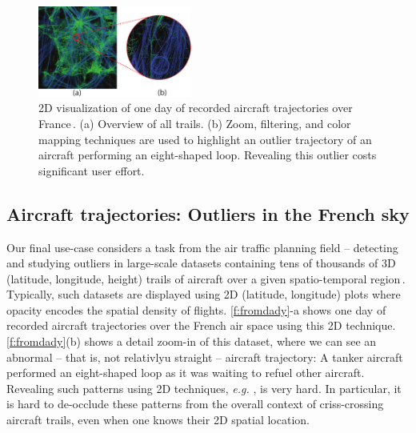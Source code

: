 \begin{figure}
\includegraphics [width=0.45\textwidth]{images/aircraft.pdf}
\vspace{-0.15cm}
\caption{2D visualization of one day of recorded aircraft trajectories over France\,\cite{hurter2009fromdady}. (a) Overview of all trails. (b) Zoom, filtering, and color mapping techniques are used to highlight an outlier trajectory of an aircraft performing an eight-shaped loop. Revealing this outlier costs significant user effort.}
\label{f:fromdady}
\vspace{-0.15cm}
\end{figure}


\subsection{Aircraft trajectories: Outliers in the French sky}
%
%
Our final use-case considers a task from the air traffic planning field -- detecting and studying outliers in large-scale datasets containing tens of thousands of 3D (latitude, longitude, height) trails of aircraft over a given spatio-temporal region\,\cite{hurter2014interactive}. Typically, such datasets are displayed using 2D (latitude, longitude) plots where opacity encodes the spatial density of flights. \autoref{f:fromdady}-a shows one day of recorded aircraft trajectories over the French air space using this 2D technique. \autoref{f:fromdady}(b) shows a detail zoom-in of this dataset, where we can see an abnormal -- that is, not relativlyu straight -- aircraft trajectory: A tanker aircraft performed an eight-shaped loop as it was waiting to refuel other aircraft. Revealing such patterns using 2D techniques, \emph{e.g.} \cite{hurter2009fromdady}, is very hard. In particular, it is hard to de-occlude these patterns from the overall context of criss-crossing aircraft trails, even when one knows their 2D spatial location.


